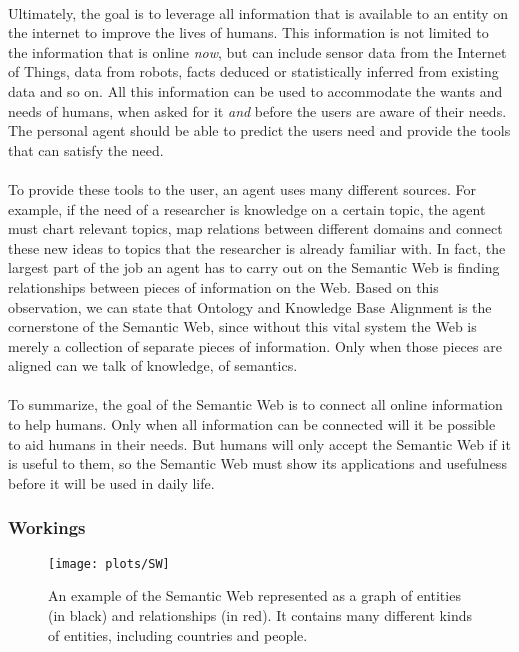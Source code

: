 \documentclass{article}
\begin{document}
 \paragraph{}
 Ultimately, the goal is to leverage all information that is available to an entity on the internet to improve the lives of humans. This information is not limited to the information that is online \emph{now}, but can include sensor data from the Internet of Things, data from robots, facts deduced or statistically inferred from existing data and so on. All this information can be used to accommodate the wants and needs of humans, when asked for it \textit{and} before the users are aware of their needs. The personal agent should be able to predict the users need and provide the tools that can satisfy the need.
 \paragraph{}
 To provide these tools to the user, an agent uses many different sources. For example, if the need of a researcher is knowledge on a certain topic, the agent must chart relevant topics, map relations between different domains and connect these new ideas to topics that the researcher is already familiar with. In fact, the largest part of the job an agent has to carry out on the Semantic Web is finding relationships between pieces of information on the Web. Based on this observation, we can state that Ontology and Knowledge Base Alignment is the cornerstone  of the Semantic Web, since without this vital system the Web is merely a collection of separate pieces of information. Only when those pieces are aligned can we talk of knowledge, of semantics.
 \paragraph{}
 To summarize, the goal of the Semantic Web is to connect all online information to help humans. Only when all information can be connected will it be possible to aid humans in their needs. But humans will only accept the Semantic Web if it is useful to them, so the Semantic Web must show its applications and usefulness before it will be used in daily life.
 \subsubsection{Workings} %
 \begin{figure}[H]
 \centering
 \texttt{[image: plots/SW]}
 \caption[Semantic Web graph]{An example of the Semantic Web represented as a graph of entities (in black) and relationships (in red). It contains many different kinds of entities, including countries and people.}
 \label{semantic_web}
 \end{figure}
 
\end{document}

